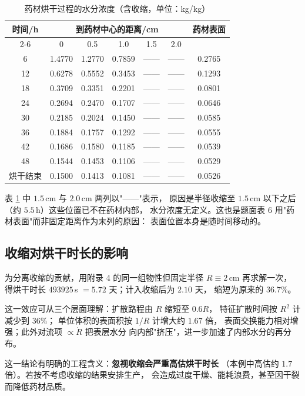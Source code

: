 \documentclass[12pt,a4paper]{ctexart}
\begin{document}
\begin{table}[htbp]
  \centering
  \caption{药材烘干过程的水分浓度（含收缩，单位：kg/kg）}
  \label{tab:p4}
  \small
  \begin{tabular}{ccccccc}
    \toprule
    \multirow{2}{*}{时间/h} & \multicolumn{5}{c}{到药材中心的距离/cm}
      & \multirow{2}{*}{药材表面} \\
    \cmidrule(lr){2-6}
     & 0     & 0.5   & 1.0   & 1.5   & 2.0 & \\
    \midrule
    6  & 1.4770 & 1.2770 & 0.7859 & —— & —— & 0.2765 \\
    12 & 0.6278 & 0.5552 & 0.3453 & —— & —— & 0.1293 \\
    18 & 0.3709 & 0.3351 & 0.2201 & —— & —— & 0.0801 \\
    24 & 0.2694 & 0.2470 & 0.1707 & —— & —— & 0.0646 \\
    30 & 0.2185 & 0.2024 & 0.1450 & —— & —— & 0.0585 \\
    36 & 0.1884 & 0.1757 & 0.1292 & —— & —— & 0.0555 \\
    42 & 0.1686 & 0.1580 & 0.1185 & —— & —— & 0.0539 \\
    48 & 0.1544 & 0.1453 & 0.1106 & —— & —— & 0.0529 \\
    烘干结束 & 0.1500 & 0.1413 & 0.1081 & —— & —— & 0.0526 \\
    \bottomrule
  \end{tabular}
\end{table}

表 \ref{tab:p4} 中 $1.5$\,cm 与 $2.0$\,cm 两列以"——"表示，
原因是半径收缩至 $1.5$\,cm 以下之后（约 $5.5$\,h）这些位置已不在药材内部，
水分浓度无定义。这也是题面表 6 用"药材表面"而非固定距离作为末列的原因：
表面位置本身是随时间移动的。

\subsection{收缩对烘干时长的影响}

为分离收缩的贡献，用附录 4 的同一组物性但固定半径 $R\equiv2$\,cm 再求解一次，
得烘干时长 $493925$\,s $=5.72$ 天；计入收缩后为 $2.10$ 天，
缩短为原来的 $36.7\%$。

这一效应可从三个层面理解：扩散路程由 $R$ 缩短至 $0.6R$，
特征扩散时间按 $R^2$ 计减少到 $36\%$；
单位体积的表面积按 $1/R$ 计增大约 $1.67$ 倍，
表面交换能力相对增强；此外对流项 $\propto\dot R$ 把表层水分
向内部"挤压"，进一步加速了内部水分的再分布。

这一结论有明确的工程含义：\textbf{忽视收缩会严重高估烘干时长}
（本例中高估约 $1.7$ 倍）。若按不考虑收缩的结果安排生产，
会造成过度干燥、能耗浪费，甚至因干裂而降低药材品质。
\end{document}
